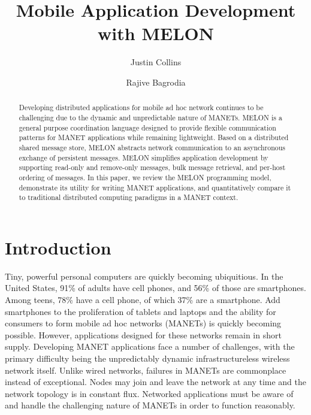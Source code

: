\documentclass{llncs}
\begin{document}
%
\title{Mobile Application Development with MELON}
%
\author{Justin Collins \and Rajive Bagrodia}
%
%

\maketitle

\begin{abstract}
Developing distributed applications for mobile ad hoc network continues to be challenging due to the dynamic and unpredictable nature of MANETs. MELON is a general purpose coordination language designed to provide flexible communication patterns for MANET applications while remaining lightweight. Based on a distributed shared message store, MELON abstracts network communication to an asynchronous exchange of persistent messages. MELON simplifies application development by supporting read-only and remove-only messages, bulk message retrieval, and per-host ordering of messages. In this paper, we review the MELON programming model, demonstrate its utility for writing MANET applications, and quantitatively compare it to traditional distributed computing paradigms in a MANET context.
\end{abstract}
%

\section{Introduction}

Tiny, powerful personal computers are quickly becoming ubiquitious. In the United States, 91\% of adults have cell phones, and 56\% of those are smartphones\cite{cellphones}. Among teens, 78\% have a cell phone, of which 37\% are a smartphone. Add smartphones to the proliferation of tablets and laptops and the ability for consumers to form mobile ad hoc networks (MANETs) is quickly becoming possible. However, applications designed for these networks remain in short supply. Developing MANET applications face a number of challenges, with the primary difficulty being the unpredictably dynamic infrastructureless wireless network itself. Unlike wired networks, failures in MANETs are commonplace instead of exceptional. Nodes may join and leave the network at any time and the network topology is in constant flux. Networked applications must be aware of and handle the challenging nature of MANETs in order to function reasonably.
\end{document}

